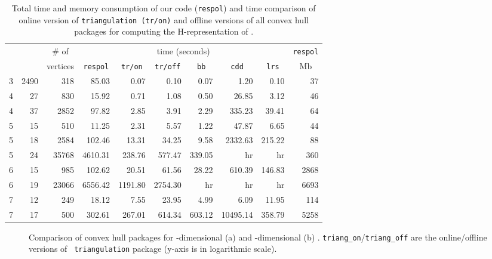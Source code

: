 \documentclass{article}
\begin{document}
\begin{table*}[t]\footnotesize \centering
\begin{tabular}{@{}crr|rr|rrrr|r}
\multirow{2}{*}{} & 
\multicolumn{1}{c}{\multirow{2}{*}{}} &
\multicolumn{1}{c|}{\# of } &
\multicolumn{6}{c|}{time (seconds)} &
\multicolumn{1}{c}{{\tt respol}} \\
\cline{4-9} & &
\multicolumn{1}{c|}{vertices} &
\multicolumn{1}{c}{{\tt respol}} &
\multicolumn{1}{c|}{{\tt tr/on}} &
\multicolumn{1}{c}{{\tt tr/off}} &
\multicolumn{1}{c}{{\tt bb}} &
\multicolumn{1}{c}{{\tt cdd}} &
\multicolumn{1}{c|}{{\tt lrs}} &
\multicolumn{1}{c}{Mb}\\
\hline
3 & 2490 & 318 & 85.03 & 0.07 & 0.10 & 0.07 & 1.20 & 0.10 & 37 \\
4 & 27 & 830 & 15.92 & 0.71 & 1.08  & 0.50 & 26.85 & 3.12 & 46 \\ 
4 & 37 & 2852 & 97.82 & 2.85 & 3.91  & 2.29 & 335.23 & 39.41 & 64 \\ 
5 & 15 & 510 & 11.25 & 2.31 & 5.57  & 1.22 & 47.87 & 6.65 & 44 \\ 
5 & 18 & 2584 & 102.46 & 13.31 & 34.25 & 9.58 & 2332.63 & 215.22 & 88 \\
5 & 24 & 35768 & 4610.31 & 238.76 & 577.47 & 339.05 & hr & hr & 360 \\
6 & 15 & 985 & 102.62 & 20.51 & 61.56 & 28.22 & 610.39 & 146.83 & 2868 \\
6 & 19 & 23066 & 6556.42 & 1191.80 & 2754.30 & hr & hr & hr &
        6693 \\
7 & 12 & 249 & 18.12 & 7.55 & 23.95 & 4.99 & 6.09 & 11.95 & 114 \\
7 & 17 & 500 & 302.61 & 267.01 & 614.34 & 603.12 & 10495.14 & 358.79 &
        5258 \\
\end{tabular}
\caption{Total time and memory consumption of our code ({\tt respol}) and
time comparison of online version 
of {\tt triangulation (tr/on)} and offline versions of all convex hull
packages for
computing the H-representation of .}
\label{tab:CHcompare} \end{table*}

\begin{figure*}[t] \centering
\caption{Comparison of convex hull packages for  -dimensional (a) and
-dimensional (b) . 
{\tt triang\_on}/{\tt triang\_off} are the online/offline versions of {\tt
triangulation} package (y-axis is in logarithmic scale).
\label{fig:CHcompare}}
\end{figure*}
\end{document}
